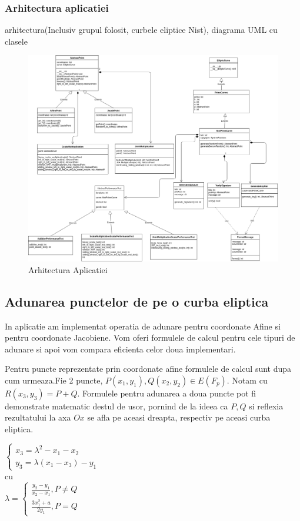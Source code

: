 \subsubsection{Arhitectura aplicatiei}
\label{sec:sec01}
arhitectura(Inclusiv grupul folosit, curbele eliptice Nist), diagrama UML cu clasele

\begin{figure}[htp]
\centering
\includegraphics[width=17.5cm]{chapters/Arhitectura.png}
\caption{Arhitectura Aplicatiei}
\label{fig:lion}
\end{figure}

\subsection{Adunarea punctelor de pe o curba eliptica}
\label{subsec:subsec02}
In aplicatie am implementat operatia de adunare pentru coordonate Afine si pentru coordonate Jacobiene. Vom oferi formulele de calcul pentru cele tipuri de adunare si apoi vom compara eficienta celor doua implementari.
\begin{dfn}
Pentru puncte reprezentate prin coordonate afine formulele de calcul sunt dupa cum urmeaza.Fie 2 puncte, $P(x_{1}, y_1), Q(x_2, y_2)\in E(F_p)$. Notam cu $R(x_3, y_3) = P + Q$. Formulele pentru adunarea a doua puncte pot fi demonstrate matematic destul de usor, pornind de la ideea ca $P, Q$ si reflexia rezultatului la axa $Ox$ se afla pe aceasi dreapta, respectiv pe aceasi curba eliptica.

$\begin{cases} 
    x_3 = \lambda^2 - x_1 - x_2 \\
    y_3 =  \lambda (x_1-x_3) - y_1
   \end{cases}$
 \\cu 
 \\$
 \lambda = 
 \begin{cases}
 \frac{y_2 - y_1}{x_2 - x_1}, P \neq Q \\ 
 \frac{3x^{2}_1 + a}{2y_1}, P = Q
 \end{cases}$ \\
\end{dfn}

